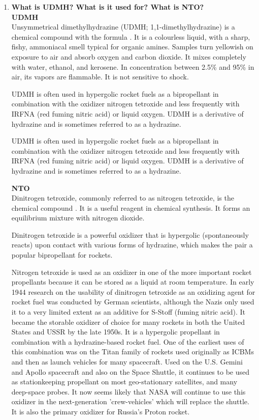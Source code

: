\begin{enumerate}
	\item {{\bf What is UDMH? What is it used for? What is NTO?}}\\

{\bf UDMH}\\
Unsymmetrical dimethylhydrazine (UDMH; 1,1-dimethylhydrazine) is a chemical compound with the formula . It is a colourless liquid, with a sharp, fishy, ammoniacal smell typical for organic amines. Samples turn yellowish on exposure to air and absorb oxygen and carbon dioxide. It mixes completely with water, ethanol, and kerosene. In concentration between 2.5\% and 95\% in air, its vapors are flammable. It is not sensitive to shock.

UDMH is often used in hypergolic rocket fuels as a bipropellant in combination with the oxidizer nitrogen tetroxide and less frequently with IRFNA (red fuming nitric acid) or liquid oxygen. UDMH is a derivative of hydrazine and is sometimes referred to as a hydrazine.

UDMH is often used in hypergolic rocket fuels as a bipropellant in combination with the oxidizer nitrogen tetroxide and less frequently with IRFNA (red fuming nitric acid) or liquid oxygen. UDMH is a derivative of hydrazine and is sometimes referred to as a hydrazine. \cite{udmh}

{\bf NTO}\\
Dinitrogen tetroxide, commonly referred to as nitrogen tetroxide, is the chemical compound . It is a useful reagent in chemical synthesis. It forms an equilibrium mixture with nitrogen dioxide.

Dinitrogen tetroxide is a powerful oxidizer that is hypergolic (spontaneously reacts) upon contact with various forms of hydrazine, which makes the pair a popular bipropellant for rockets.

Nitrogen tetroxide is used as an oxidizer in one of the more important rocket propellants because it can be stored as a liquid at room temperature. In early 1944 research on the usability of dinitrogen tetroxide as an oxidizing agent for rocket fuel was conducted by German scientists, although the Nazis only used it to a very limited extent as an additive for S-Stoff (fuming nitric acid). It became the storable oxidizer of choice for many rockets in both the United States and USSR by the late 1950s. It is a hypergolic propellant in combination with a hydrazine-based rocket fuel. One of the earliest uses of this combination was on the Titan family of rockets used originally as ICBMs and then as launch vehicles for many spacecraft. Used on the U.S. Gemini and Apollo spacecraft and also on the Space Shuttle, it continues to be used as stationkeeping propellant on most geo-stationary satellites, and many deep-space probes. It now seems likely that NASA will continue to use this oxidizer in the next-generation 'crew-vehicles' which will replace the shuttle. It is also the primary oxidizer for Russia's Proton rocket.


\end{enumerate}
